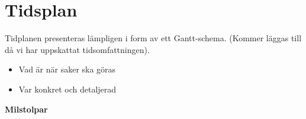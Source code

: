\documentclass[12pt,a4paper]{article}
\begin{document}
% 
% 
% 
% 
% 
% 
% 
% 
% 
% 

\section{Tidsplan}

Tidplanen presenteras lämpligen i form av ett Gantt-schema.
(Kommer läggas till då vi har uppskattat tidsomfattningen).

\begin{itemize}
    \item Vad är när saker ska göras
    \item Var konkret och detaljerad
\end{itemize}

\textbf{Milstolpar}
\end{document}
